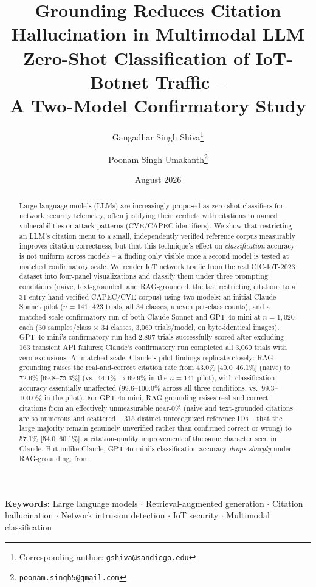 \documentclass[10pt,twocolumn]{article}
\title{Grounding Reduces Citation Hallucination in Multimodal LLM\\
Zero-Shot Classification of IoT-Botnet Traffic --\\
\large A Two-Model Confirmatory Study}
\author[1]{Gangadhar Singh Shiva\thanks{Corresponding author: \texttt{gshiva@sandiego.edu}}}
\author[2]{Poonam Singh Umakanth\thanks{\texttt{poonam.singh5@gmail.com}}}
\affil[1]{University of San Diego, San Diego, CA, USA}
\affil[2]{HPE Juniper Networking, Hewlett Packard Enterprise}
\date{August 2026}
\begin{document}
\maketitle

\noindent\textbf{Keywords:} Large language models $\cdot$ Retrieval-augmented generation $\cdot$
Citation hallucination $\cdot$ Network intrusion detection $\cdot$ IoT security $\cdot$
Multimodal classification

\begin{abstract}
Large language models (LLMs) are increasingly proposed as zero-shot classifiers for network
security telemetry, often justifying their verdicts with citations to named vulnerabilities or
attack patterns (CVE/CAPEC identifiers). We show that restricting an LLM's citation menu to a
small, independently verified reference corpus measurably improves citation correctness, but
that this technique's effect on \emph{classification} accuracy is not uniform across models --
a finding only visible once a second model is tested at matched confirmatory scale. We render IoT network traffic
from the real CIC-IoT-2023 dataset into four-panel visualizations and classify
them under three prompting conditions (naive, text-grounded, and RAG-grounded, the last
restricting citations to a 31-entry hand-verified CAPEC/CVE corpus) using two models: an initial
Claude Sonnet pilot ($n=141$, 423 trials, all 34 classes, uneven per-class counts), and a
matched-scale confirmatory run of both Claude Sonnet and GPT-4o-mini at $n=1{,}020$ each
(30 samples/class $\times$ 34 classes, 3,060 trials/model, on byte-identical images). GPT-4o-mini's
confirmatory run had 2,897 trials successfully scored after excluding 163 transient API failures;
Claude's confirmatory run completed all 3,060 trials with zero exclusions. At matched scale,
Claude's pilot findings replicate closely: RAG-grounding raises the real-and-correct citation rate
from 43.0\% [40.0--46.1\%] (naive) to 72.6\% [69.8--75.3\%] (vs.\ 44.1\%$\to$69.9\% in the
$n=141$ pilot), with classification accuracy essentially unaffected (99.6--100.0\% across all
three conditions, vs.\ 99.3--100.0\% in the pilot). For GPT-4o-mini, RAG-grounding raises
real-and-correct citations from an effectively unmeasurable near-0\% (naive and text-grounded
citations are so numerous and scattered -- 315 distinct unrecognized reference IDs -- that the
large majority remain genuinely unverified rather than confirmed correct or wrong) to 57.1\%
[54.0--60.1\%], a citation-quality improvement of the same character seen in Claude. But unlike
Claude, GPT-4o-mini's classification accuracy \emph{drops sharply} under RAG-grounding, from

\end{abstract}
\end{document}
